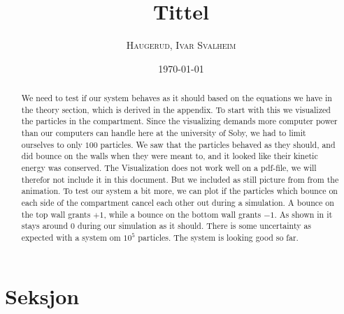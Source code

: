 \documentclass[%
 reprint,
 amsmath,amssymb,
 aps,
]{revtex4-1}
\begin{document}

\title{Tittel}%

\author{\textsc{Haugerud, Ivar Svalheim}}
%

\date{\today}%

\begin{abstract}
We need to test if our system behaves as it should based on the equations we have in the theory section, which is derived in the appendix. To start with this we visualized the particles in the compartment. Since the visualizing demands more computer power than our computers can handle here at the university of Soby, we had to limit ourselves to only $100$ particles. We saw that the particles behaved as they should, and did bounce on the walls when they were meant to, and it looked like their kinetic energy was conserved. The Visualization does not work well on a pdf-file, we will therefor not include it in this document. But we included as still picture from from the animation. To test our system a bit more, we can plot if the particles which bounce on each side of the compartment cancel each other out during a simulation. A bounce on the top wall grants $+1$, while a bounce on the bottom wall grants $-1$.  As shown in it stays around $0$ during our simulation as it should. There is some uncertainty as expected with a system om $10^{5}$ particles. The system is looking good so far.
\end{abstract}

\maketitle


\section{\label{sec:level1}Seksjon}
\end{document}
